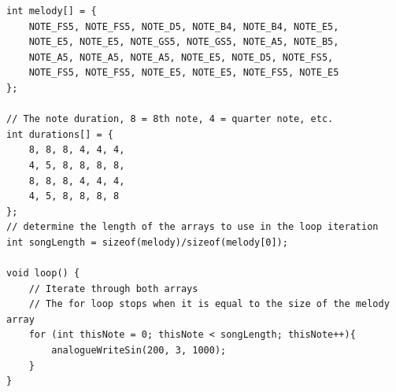 \documentclass[prb,preprint]{revtex4-1}
\begin{document}
\begin{verbatim}
int melody[] = {
    NOTE_FS5, NOTE_FS5, NOTE_D5, NOTE_B4, NOTE_B4, NOTE_E5, 
    NOTE_E5, NOTE_E5, NOTE_GS5, NOTE_GS5, NOTE_A5, NOTE_B5, 
    NOTE_A5, NOTE_A5, NOTE_A5, NOTE_E5, NOTE_D5, NOTE_FS5, 
    NOTE_FS5, NOTE_FS5, NOTE_E5, NOTE_E5, NOTE_FS5, NOTE_E5
};

// The note duration, 8 = 8th note, 4 = quarter note, etc.
int durations[] = {
    8, 8, 8, 4, 4, 4, 
    4, 5, 8, 8, 8, 8, 
    8, 8, 8, 4, 4, 4, 
    4, 5, 8, 8, 8, 8
};
// determine the length of the arrays to use in the loop iteration
int songLength = sizeof(melody)/sizeof(melody[0]);

void loop() {
    // Iterate through both arrays
    // The for loop stops when it is equal to the size of the melody array
    for (int thisNote = 0; thisNote < songLength; thisNote++){
        analogueWriteSin(200, 3, 1000);
    }
}
\end{verbatim}
\end{document}

